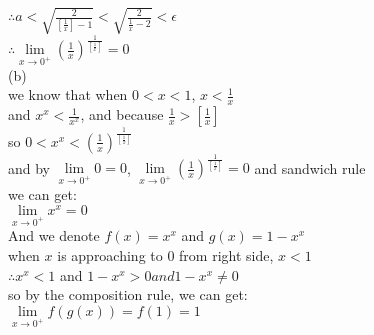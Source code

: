 \documentclass{article}
\begin{document}
$\therefore$\qquad$a<\sqrt{\frac{2}{\left[\frac{1}{x}\right]-1}}<\sqrt{\frac{2}{\frac{1}{x}-2}}<\epsilon$\\

$\therefore$\qquad$\lim \limits_{x \to 0^+}\displaystyle\left(\frac{1}{x}\right)^{\frac{1}{\left[\frac{1}{x}\right]}}=0$\\

(b)\\

we know that when $0<x<1$, $x<\displaystyle\frac{1}{x}$\\

and $x^x<\displaystyle\frac{1}{x^x}$, and because $\displaystyle\frac{1}{x}>\left[\frac{1}{x}\right]$\\

so $0<x^x<\left(\displaystyle\frac{1}{x}\right)^\frac{1}{\left[\frac{1}{x}\right]}$\\

and by $\lim \limits_{x \to 0^+}0=0$, $\lim \limits_{x \to 0^+}\displaystyle\left(\frac{1}{x}\right)^{\frac{1}{\left[\frac{1}{x}\right]}}=0$ and sandwich rule\\

we can get:\\

$\lim \limits_{x \to 0^+}x^x=0$\\

And we denote $f(x)=x^x$ and $g(x)=1-x^x$\\

when $x$ is approaching to $0$ from right side, $x<1$\\

$\therefore$\qquad$x^x<1$ and $1-x^x>0 and 1-x^x\neq0$\\

so by the composition rule, we can get:\\

$\lim \limits_{x \to 0^+}f\left(g(x)\right)=f(1)=1$\\
\end{document}
